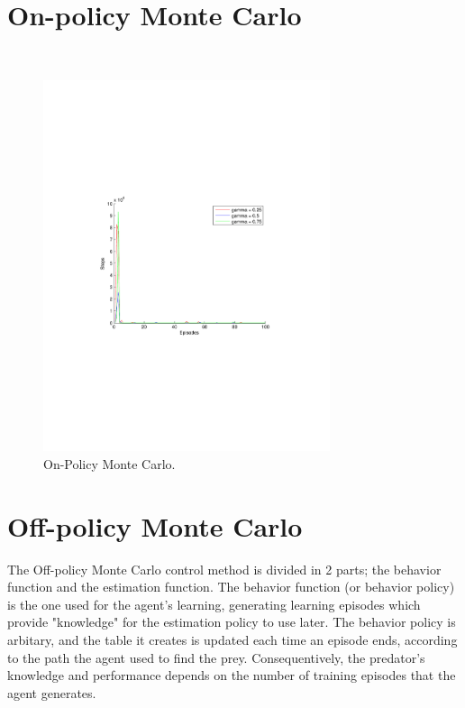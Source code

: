 \documentclass[a4paper,11pt]{article}
\begin{document}
\section*{On-policy Monte Carlo}
~
\begin{figure}[t!]
  \centering
    \includegraphics[trim=4cm 8.5cm 4cm 8.5cm,clip,width=0.75\textwidth]{figures/onmc.pdf}
    \caption{On-Policy Monte Carlo.}
     \label{onmc}
\end{figure}
\newpage


\section*{Off-policy Monte Carlo}
The Off-policy Monte Carlo control method is divided in 2 parts; the behavior function and the estimation function. The behavior function (or behavior policy) is the one used for the agent's learning, generating learning episodes which provide "knowledge" for the estimation policy to use later. The behavior policy is arbitary, and the table it creates is updated each time an episode ends, according to the path the agent used to find the prey. Consequentively, the predator's knowledge and performance depends on the number of training episodes that the agent generates.
\end{document}
